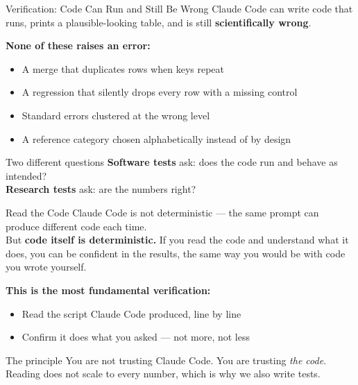 \documentclass[aspectratio=169, 11pt]{beamer}
\begin{document}

\begin{frame}{Verification: Code Can Run and Still Be Wrong}
  Claude Code can write code that runs, prints a plausible-looking table, and is still \textbf{scientifically wrong}.

  \vspace{0.4em}
  \textbf{None of these raises an error:}
  \begin{itemize}
    \small
    \item A merge that duplicates rows when keys repeat
    \item A regression that silently drops every row with a missing control
    \item Standard errors clustered at the wrong level
    \item A reference category chosen alphabetically instead of by design
  \end{itemize}

  \vspace{0.4em}
  \begin{block}{Two different questions}
    \textbf{Software tests} ask: does the code run and behave as intended?\\
    \textbf{Research tests} ask: are the numbers right?
  \end{block}
\end{frame}

\begin{frame}{Read the Code}
  Claude Code is not deterministic --- the same prompt can produce different code each time.\\
  But \textbf{code itself is deterministic.} If you read the code and understand what it does, you can be confident in the results, the same way you would be with code you wrote yourself.

  \vspace{0.6em}
  \textbf{This is the most fundamental verification:}
  \begin{itemize}
    \item Read the script Claude Code produced, line by line
    \item Confirm it does what you asked --- not more, not less
  \end{itemize}

  \vspace{0.6em}
  \begin{block}{The principle}
    You are not trusting Claude Code. You are trusting \textit{the code}. Reading does not scale to every number, which is why we also write tests.
  \end{block}
\end{frame}
\end{document}
